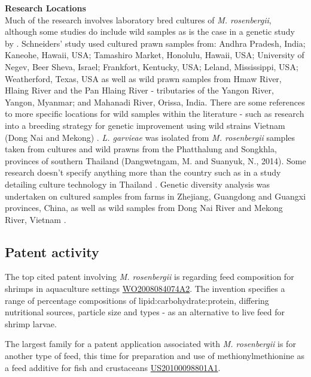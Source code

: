 \documentclass[openany]{book}
\theoremstyle{definition}
\theoremstyle{definition}
\theoremstyle{definition}
\theoremstyle{remark}
\begin{document}
\textbf{Research Locations}\\
Much of the research involves laboratory bred cultures of \emph{M.
rosenbergii}, although some studies do include wild samples as is the
case in a genetic study by \citeauthor{Schneider_2012}
\citetext{\citeyear{Schneider_2012}; \citealp{Schneider_2012}}.
Schneiders' study used cultured prawn samples from: Andhra Pradesh,
India; Kaneohe, Hawaii, USA; Tamashiro Market, Honolulu, Hawaii, USA;
University of Negev, Beer Sheva, Israel; Frankfort, Kentucky, USA;
Leland, Mississippi, USA; Weatherford, Texas, USA as well as wild prawn
samples from Hmaw River, Hlaing River and the Pan Hlaing River -
tributaries of the Yangon River, Yangon, Myanmar; and Mahanadi River,
Orissa, India. There are some references to more specific locations for
wild samples within the literature - such as research into a breeding
strategy for genetic improvement using wild strains Vietnam (Dong Nai
and Mekong) \citep{Thanh_2010, Tidwell_2014}. \emph{L. garvieae} was
isolated from \emph{M. rosenbergii} samples taken from cultures and wild
prawns from the Phatthalung and Songkhla, provinces of southern Thailand
(Dangwetngam, M. and Suanyuk, N., 2014). Some research doesn't specify
anything more than the country such as in a study detailing culture
technology in Thailand \citep{Na_Nakorn_2012}. Genetic diversity
analysis was undertaken on cultured samples from farms in Zhejiang,
Guangdong and Guangxi provinces, China, as well as wild samples from
Dong Nai River and Mekong River, Vietnam \citep{Nguyen_Thanh_2015}.

\hypertarget{patent-activity-3}{%
\subsection{Patent activity}\label{patent-activity-3}}

The top cited patent involving \emph{M. rosenbergii} is regarding feed
composition for shrimps in aquaculture settings
\href{https://www.lens.org/lens/patent/WO_2008_084074_A2}{WO2008084074A2}.
The invention specifies a range of percentage compositions of
lipid:carbohydrate:protein, differing nutritional sources, particle size
and types - as an alternative to live feed for shrimp larvae.

The largest family for a patent application associated with \emph{M.
rosenbergii} is for another type of feed, this time for preparation and
use of methionylmethionine as a feed additive for fish and crustaceans
\href{https://www.lens.org/lens/patent/US_2010_0098801_A1}{US20100098801A1}.
\end{document}
